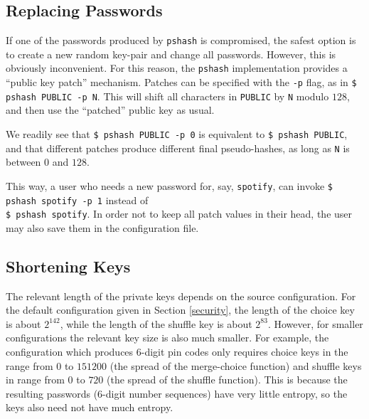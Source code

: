 \documentclass[a4paper, 10pt]{article}
\theoremstyle{plain}
\theoremstyle{definition}
\begin{document}
\subsection{Replacing Passwords}

If one of the passwords produced by \texttt{pshash} is compromised, the safest option is to create a new random key-pair and change all passwords. However, this is obviously inconvenient. For this reason, the \texttt{pshash} implementation provides a ``public key patch'' mechanism. Patches can be specified with the \verb|-p| flag, as in \verb|$ pshash PUBLIC -p N|. This will shift all characters in \verb|PUBLIC| by \verb|N| modulo $128$, and then use the ``patched'' public key as usual.

We readily see that \verb|$ pshash PUBLIC -p 0| is equivalent to \verb|$ pshash PUBLIC|, and that different patches produce different final pseudo-hashes, as long as \verb|N| is between $0$ and $128$.

This way, a user who needs a new password for, say, \verb|spotify|, can invoke \verb|$ pshash spotify -p 1| instead of\\ \verb|$ pshash spotify|. In order not to keep all patch values in their head, the user may also save them in the configuration file.

\subsection{Shortening Keys}%
The relevant length of the private keys depends on the source configuration. For the default configuration given in Section \ref{security}, the length of the choice key is about $2^{142}$, while the length of the shuffle key is about $2^{83}$. However, for smaller configurations the relevant key size is also much smaller. For example, the configuration which produces 6-digit pin codes only requires choice keys in the range from $0$ to $151200$ (the spread of the merge-choice function) and shuffle keys in range from $0$ to $720$ (the spread of the shuffle function). This is because the resulting passwords (6-digit number sequences) have very little entropy, so the keys also need not have much entropy.
\end{document}
